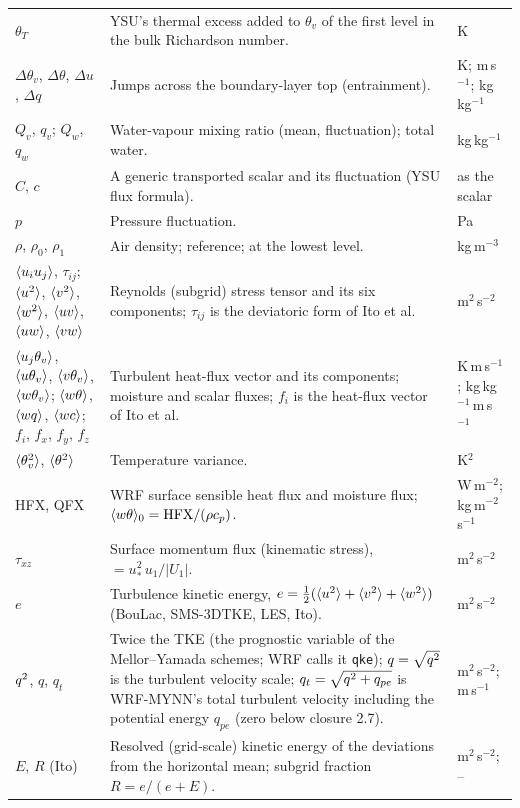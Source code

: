 \begin{xltabular}{\linewidth}{@{}>{\raggedright\arraybackslash}p{3.6cm} >{\raggedright\arraybackslash}X >{\raggedright\arraybackslash}p{2.3cm}@{}}
$\theta_T$ & YSU's thermal excess added to $\theta_v$ of the first level in the bulk Richardson number. & K \\
$\Delta\theta_v$, $\Delta\theta$, $\Delta u$, $\Delta q$ & Jumps across the boundary-layer top (entrainment). & K; m\,s$^{-1}$; kg\,kg$^{-1}$ \\
$Q_v$, $q_v$; $Q_w$, $q_w$ & Water-vapour mixing ratio (mean, fluctuation); total water. & kg\,kg$^{-1}$ \\
$C$, $c$ & A generic transported scalar and its fluctuation (YSU flux formula). & as the scalar \\
$p$ & Pressure fluctuation. & Pa \\
$\rho$, $\rho_0$, $\rho_1$ & Air density; reference; at the lowest level. & kg\,m$^{-3}$ \\
$\langle u_iu_j \rangle$, $\tau_{ij}$; $\langle u^2 \rangle$, $\langle v^2 \rangle$, $\langle w^2 \rangle$, $\langle uv \rangle$, $\langle uw \rangle$, $\langle vw \rangle$ & Reynolds (subgrid) stress tensor and its six components; $\tau_{ij}$ is the deviatoric form of Ito et al. & m$^2$\,s$^{-2}$ \\
$\langle u_j\theta_v \rangle$, $\langle u\theta_v \rangle$, $\langle v\theta_v \rangle$, $\langle w\theta_v \rangle$; $\langle w\theta \rangle$, $\langle wq \rangle$, $\langle wc \rangle$; $f_i$, $f_x$, $f_y$, $f_z$ & Turbulent heat-flux vector and its components; moisture and scalar fluxes; $f_i$ is the heat-flux vector of Ito et al. & K\,m\,s$^{-1}$; kg\,kg$^{-1}$\,m\,s$^{-1}$ \\
$\langle \theta_v^2 \rangle$, $\langle \theta^2 \rangle$ & Temperature variance. & K$^2$ \\
HFX, QFX & WRF surface sensible heat flux and moisture flux; $\langle w\theta \rangle_0 = \mathrm{HFX}/(\rho c_p)$. & W\,m$^{-2}$; kg\,m$^{-2}$\,s$^{-1}$ \\
$\tau_{xz}$ & Surface momentum flux (kinematic stress), $= u_*^2\,u_1/|U_1|$. & m$^2$\,s$^{-2}$ \\
$e$ & Turbulence kinetic energy, $e = \tfrac12(\langle u^2 \rangle + \langle v^2 \rangle + \langle w^2 \rangle)$ (BouLac, SMS-3DTKE, LES, Ito). & m$^2$\,s$^{-2}$ \\
$q^{2}$, $q$, $q_t$ & Twice the TKE (the prognostic variable of the Mellor--Yamada schemes; WRF calls it \texttt{qke}); $q = \sqrt{q^{2}}$ is the turbulent velocity scale; $q_t = \sqrt{q^{2} + q_{pe}}$ is WRF-MYNN's total turbulent velocity including the potential energy $q_{pe}$ (zero below closure 2.7). & m$^2$\,s$^{-2}$; m\,s$^{-1}$ \\
$E$, $R$ (Ito) & Resolved (grid-scale) kinetic energy of the deviations from the horizontal mean; subgrid fraction $R = e/(e + E)$. & m$^2$\,s$^{-2}$; -- \\

\end{xltabular}
